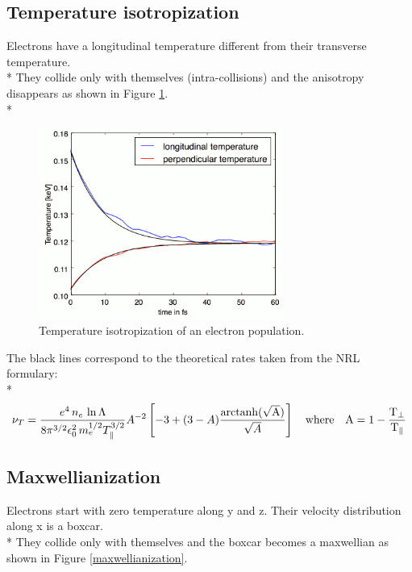 \documentclass[11pt]{article}
\begin{document}
\clearpage

\subsection{Temperature isotropization}
Electrons have a longitudinal temperature different from their transverse temperature.\\*
They collide only with themselves (intra-collisions) and the anisotropy disappears as shown in Figure \ref{temperature_isotropization}.\\*

\begin{figure}[h]
\centering
\includegraphics[width=8cm]{temperature_isotropization1}
\caption{Temperature isotropization of an electron population.}
\label{temperature_isotropization}
\end{figure}

The black lines correspond to the theoretical rates taken from the NRL formulary:\\*
\begin{equation*}
\nu_T=\frac{e^4 \,n_e\,\ln\Lambda } { 8\pi^{3/2} \epsilon_0^2 \,m_e^{1/2}T_\|^{3/2} } A^{-2} \left[-3+(3-A)\frac{\rm{arctanh}(\sqrt{A})}{\sqrt{A}}\right]
\quad \rm{where}\quad A=1-\frac{T_\perp}{T_\|}
\end{equation*}


\subsection{Maxwellianization}
Electrons start with zero temperature along y and z. Their velocity distribution along x is a boxcar.\\*
They collide only with themselves and the boxcar becomes a maxwellian as shown in Figure \ref{maxwellianization}.
\end{document}
